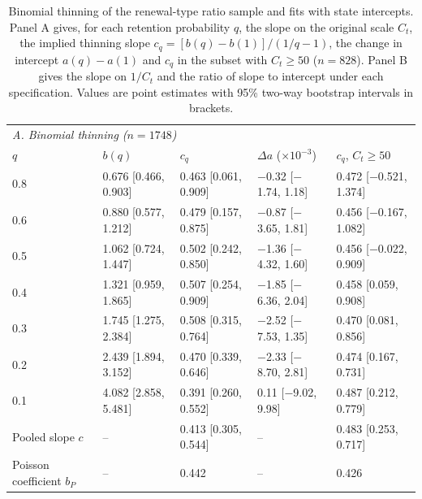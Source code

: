 \begin{table}[htbp]
\centering
\footnotesize
\setlength{\tabcolsep}{4pt}
\caption{Binomial thinning of the renewal-type ratio sample and fits with state intercepts. Panel A gives, for each retention probability $q$, the slope on the original scale $C_t$, the implied thinning slope $c_q=[b(q)-b(1)]/(1/q-1)$, the change in intercept $a(q)-a(1)$ and $c_q$ in the subset with $C_t\ge50$ ($n=828$). Panel B gives the slope on $1/C_t$ and the ratio of slope to intercept under each specification. Values are point estimates with 95\% two-way bootstrap intervals in brackets.}
\label{tab:s11}
\begin{tabular}{lllll}
\toprule
\multicolumn{5}{l}{\textit{A. Binomial thinning ($n=1748$)}}\\
$q$ & $b(q)$ & $c_q$ & $\Delta a$ ($\times10^{-3}$) & $c_q$, $C_t\ge50$ \\
\midrule
0.8 & 0.676 [0.466, 0.903] & 0.463 [0.061, 0.909] & $-$0.32 [$-$1.74, 1.18] & 0.472 [$-$0.521, 1.374] \\
0.6 & 0.880 [0.577, 1.212] & 0.479 [0.157, 0.875] & $-$0.87 [$-$3.65, 1.81] & 0.456 [$-$0.167, 1.082] \\
0.5 & 1.062 [0.724, 1.447] & 0.502 [0.242, 0.850] & $-$1.36 [$-$4.32, 1.60] & 0.456 [$-$0.022, 0.909] \\
0.4 & 1.321 [0.959, 1.865] & 0.507 [0.254, 0.909] & $-$1.85 [$-$6.36, 2.04] & 0.458 [0.059, 0.908] \\
0.3 & 1.745 [1.275, 2.384] & 0.508 [0.315, 0.764] & $-$2.52 [$-$7.53, 1.35] & 0.470 [0.081, 0.856] \\
0.2 & 2.439 [1.894, 3.152] & 0.470 [0.339, 0.646] & $-$2.33 [$-$8.70, 2.81] & 0.474 [0.167, 0.731] \\
0.1 & 4.082 [2.858, 5.481] & 0.391 [0.260, 0.552] & 0.11 [$-$9.02, 9.98] & 0.487 [0.212, 0.779] \\
\midrule
Pooled slope $c$ & -- & 0.413 [0.305, 0.544] & -- & 0.483 [0.253, 0.717] \\
Poisson coefficient $b_P$ & -- & 0.442 & -- & 0.426 \\
\bottomrule
\end{tabular}


\end{table}
